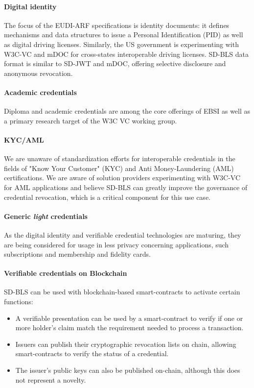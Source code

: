 \paragraph{Digital identity}
The focus of the EUDI-ARF specifications is identity documents: it
defines mechanisms and data structures to issue a Personal
Identification (PID) as well as digital driving licenses. Similarly,
the US government is experimenting with W3C-VC and mDOC for
cross-states interoperable driving licenses. SD-BLS data format is
similar to SD-JWT and mDOC, offering selective disclosure and
anonymous revocation.

\paragraph{Academic credentials}
Diploma and academic credentials are among the core offerings of EBSI
as well as a primary research target of the W3C VC working group.

\paragraph{KYC/AML}
We are unaware of standardization efforts for interoperable
credentials in the fields of "Know Your Customer" (KYC) and Anti
Money-Laundering (AML) certifications. We are aware of solution
providers experimenting with W3C-VC for AML applications and believe
SD-BLS can greatly improve the governance of credential revocation,
which is a critical component for this use case.

\paragraph{Generic \textit{light} credentials}
As the digital identity and verifiable credential technologies are
maturing, they are being considered for usage in less privacy
concerning applications, such subscriptions and membership and
fidelity cards.

\paragraph{Verifiable credentials on Blockchain}
SD-BLS can be used with blockchain-based smart-contracts to activate
certain functions:
\begin{itemize}
    \item A verifiable presentation can be used by a smart-contract to
      verify if one or more holder's claim match the requirement
      needed to process a transaction.
    \item Issuers can publish their cryptographic revocation lists on
      chain, allowing smart-contracts to verify the status of a
      credential.
    \item The issuer's public keys can also be published on-chain,
      although this does not represent a novelty.
\end{itemize}

